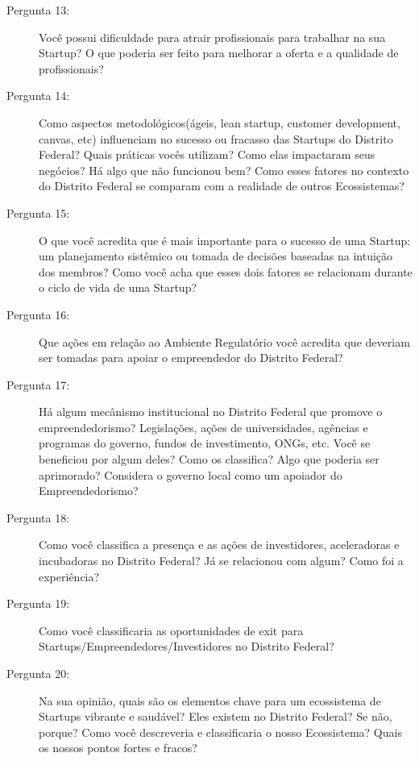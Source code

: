 \begin{description}
  \item [Pergunta 13:] Você possui dificuldade para atrair profissionais para trabalhar na sua Startup? O que poderia ser feito para melhorar a oferta e a qualidade de profissionais?
  
  \item [Pergunta 14:] Como aspectos metodológicos(ágeis, lean startup, customer development, canvas, etc) influenciam no sucesso ou fracasso das Startups do Distrito Federal? Quais práticas vocês utilizam? Como elas impactaram seus negócios? Há algo que não funcionou bem? Como esses fatores no contexto do Distrito Federal se comparam com a realidade de outros Ecossistemas?

  \item [Pergunta 15:] O que você acredita que é mais importante para o sucesso de uma Startup: um planejamento sistêmico ou tomada de decisões baseadas na intuição dos membros? Como você acha que esses dois fatores se relacionam durante o ciclo de vida de uma Startup? 


  \item [Pergunta 16:] Que ações em relação ao Ambiente Regulatório você acredita que deveriam ser tomadas para apoiar o empreendedor do Distrito Federal?

  \item [Pergunta 17:] Há algum mecânismo institucional no Distrito Federal que promove o empreendedorismo? Legislações, ações de universidades, agências e programas do governo, fundos de investimento, ONGs, etc. Você se beneficiou por algum deles? Como os classifica? Algo que poderia ser aprimorado? Considera o governo local como um apoiador do Empreendedorismo?

  \item [Pergunta 18:] Como você classifica a presença e as ações de investidores, aceleradoras e incubadoras no Distrito Federal? Já se relacionou com algum? Como foi a experiência?

  \item [Pergunta 19:] Como você classificaria as oportunidades de exit para Startups/Empreendedores/Investidores no Distrito Federal? 

  
  \item [Pergunta 20:] Na sua opinião, quais são os elementos chave para um ecossistema de Startups vibrante e saudável? Eles existem no Distrito Federal? Se não, porque? Como você descreveria e classificaria o nosso Ecossistema? Quais os nossos pontos fortes e fracos?
\end{description}

